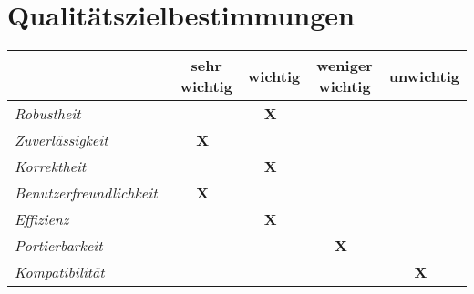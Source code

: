 \section{Qualitätszielbestimmungen}


\begin{center}
 \begin{tabular}{l|c|c|c|c}
  ~ & sehr wichtig & wichtig & weniger wichtig & unwichtig\\
  \hline \hline
  \textit{Robustheit}~ &  ~ ~ ~ & \textbf{X}~ &  ~ ~ ~ &  ~ ~ ~ \\
  \hline
  \textit{Zuverlässigkeit}~ & \textbf{X}~ &  ~ ~ ~ &  ~ ~ ~ &  ~ ~ ~ \\
  \hline
  \textit{Korrektheit}~ &  ~ ~ ~ & \textbf{X}~ &  ~ ~ ~ &  ~ ~ ~ \\
  \hline
  \textit{Benutzerfreundlichkeit}~ &  \textbf{X}~ & ~ ~ ~ & ~ ~ ~ &  ~ ~ ~ \\
  \hline
  \textit{Effizienz}~ &  ~ ~ ~ & \textbf{X}~ &  ~ ~ ~ &  ~ ~ ~ \\
  \hline
  \textit{Portierbarkeit}~ &  ~ ~ ~ &  ~ ~ ~ & \textbf{X}~ &  ~ ~ ~ \\
  \hline
  \textit{Kompatibilität}~ &  ~ ~ ~ &  ~ ~ ~ & ~ ~ ~ & \textbf{X}~  \\
 \end{tabular}
\end{center}
